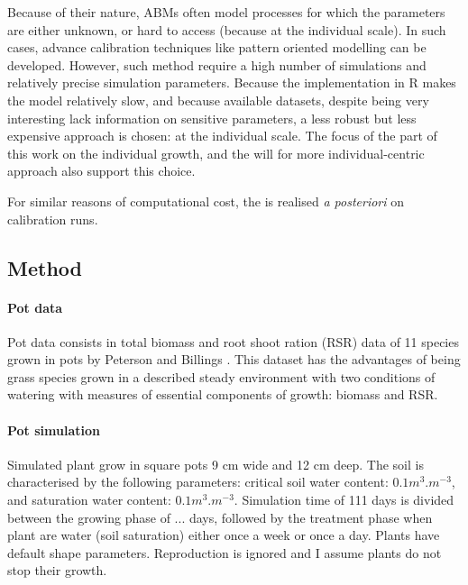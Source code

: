 Because of their nature, ABMs often model processes for which the parameters are either unknown, or hard to access (because at the individual scale). In such cases, advance calibration techniques like pattern oriented modelling\cite{grimm_pattern-oriented_2005, hartig} can be developed. However, such method require a high number of simulations and relatively precise simulation parameters. Because the implementation in R makes the model relatively slow, and because available datasets, despite being very interesting lack information on sensitive parameters, a less robust but less expensive approach is chosen:  at the individual scale. The focus of the part of this work on the individual growth, and the will for more individual-centric approach also support this choice.

 For similar reasons of computational cost, the  is  realised \textit{a posteriori} on calibration runs.

\subsection{Method}

\paragraph{Pot data}
Pot data consists in total biomass and root shoot ration (RSR) data of 11 species grown in pots by Peterson and Billings \cite{peterson_growth_1982}. This dataset has the advantages of being grass species grown in a described steady environment with two conditions of watering with measures of essential components of growth: biomass and RSR.

\paragraph{Pot simulation}
Simulated plant grow in square pots 9 cm wide and 12 cm deep. The soil is characterised by the following parameters: critical soil water content: $0.1 m^3.m^{-3}$, and saturation water content: $0.1 m^3.m^{-3}$. Simulation time of 111 days is divided between the growing phase of ... days, followed by the treatment phase when plant are water (soil saturation) either once a week or once a day. Plants have default shape parameters. Reproduction is ignored and I assume plants do not stop their growth.

